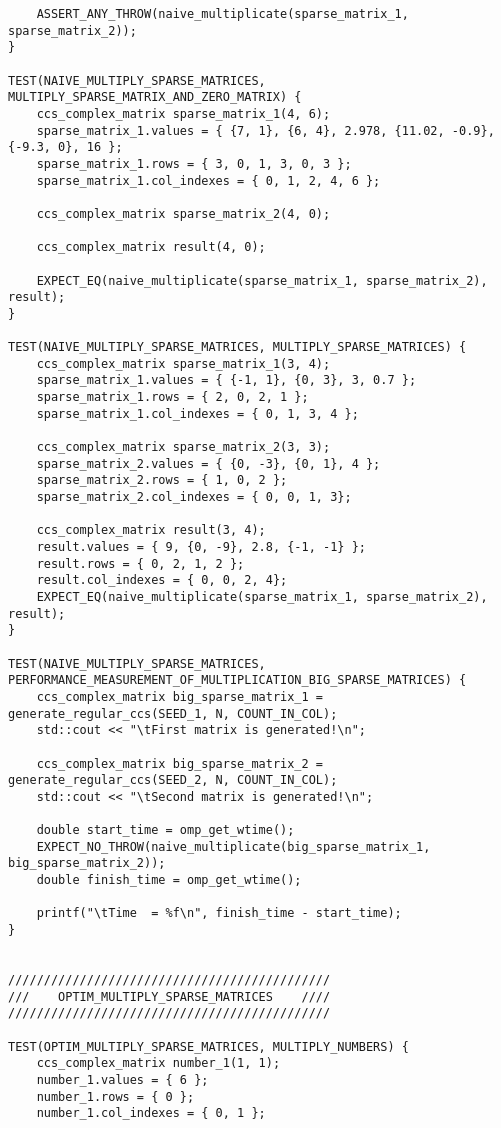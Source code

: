 \documentclass{report}
\begin{document}
\begin{lstlisting}
    ASSERT_ANY_THROW(naive_multiplicate(sparse_matrix_1, sparse_matrix_2));
}

TEST(NAIVE_MULTIPLY_SPARSE_MATRICES, MULTIPLY_SPARSE_MATRIX_AND_ZERO_MATRIX) {
    ccs_complex_matrix sparse_matrix_1(4, 6);
    sparse_matrix_1.values = { {7, 1}, {6, 4}, 2.978, {11.02, -0.9}, {-9.3, 0}, 16 };
    sparse_matrix_1.rows = { 3, 0, 1, 3, 0, 3 };
    sparse_matrix_1.col_indexes = { 0, 1, 2, 4, 6 };
    
    ccs_complex_matrix sparse_matrix_2(4, 0);
    
    ccs_complex_matrix result(4, 0);

    EXPECT_EQ(naive_multiplicate(sparse_matrix_1, sparse_matrix_2), result);
}

TEST(NAIVE_MULTIPLY_SPARSE_MATRICES, MULTIPLY_SPARSE_MATRICES) {
    ccs_complex_matrix sparse_matrix_1(3, 4);
    sparse_matrix_1.values = { {-1, 1}, {0, 3}, 3, 0.7 };
    sparse_matrix_1.rows = { 2, 0, 2, 1 };
    sparse_matrix_1.col_indexes = { 0, 1, 3, 4 };
    
    ccs_complex_matrix sparse_matrix_2(3, 3);
    sparse_matrix_2.values = { {0, -3}, {0, 1}, 4 };
    sparse_matrix_2.rows = { 1, 0, 2 };
    sparse_matrix_2.col_indexes = { 0, 0, 1, 3};
    
    ccs_complex_matrix result(3, 4);
    result.values = { 9, {0, -9}, 2.8, {-1, -1} };
    result.rows = { 0, 2, 1, 2 };
    result.col_indexes = { 0, 0, 2, 4};
    EXPECT_EQ(naive_multiplicate(sparse_matrix_1, sparse_matrix_2), result);
}

TEST(NAIVE_MULTIPLY_SPARSE_MATRICES, PERFORMANCE_MEASUREMENT_OF_MULTIPLICATION_BIG_SPARSE_MATRICES) {
    ccs_complex_matrix big_sparse_matrix_1 = generate_regular_ccs(SEED_1, N, COUNT_IN_COL);
    std::cout << "\tFirst matrix is generated!\n";

    ccs_complex_matrix big_sparse_matrix_2 = generate_regular_ccs(SEED_2, N, COUNT_IN_COL);
    std::cout << "\tSecond matrix is generated!\n";

    double start_time = omp_get_wtime();
    EXPECT_NO_THROW(naive_multiplicate(big_sparse_matrix_1, big_sparse_matrix_2));
    double finish_time = omp_get_wtime();

    printf("\tTime  = %f\n", finish_time - start_time);
}


/////////////////////////////////////////////
///    OPTIM_MULTIPLY_SPARSE_MATRICES    ////
/////////////////////////////////////////////

TEST(OPTIM_MULTIPLY_SPARSE_MATRICES, MULTIPLY_NUMBERS) {
    ccs_complex_matrix number_1(1, 1);
    number_1.values = { 6 };
    number_1.rows = { 0 };
    number_1.col_indexes = { 0, 1 };
    

\end{lstlisting}
\end{document}
